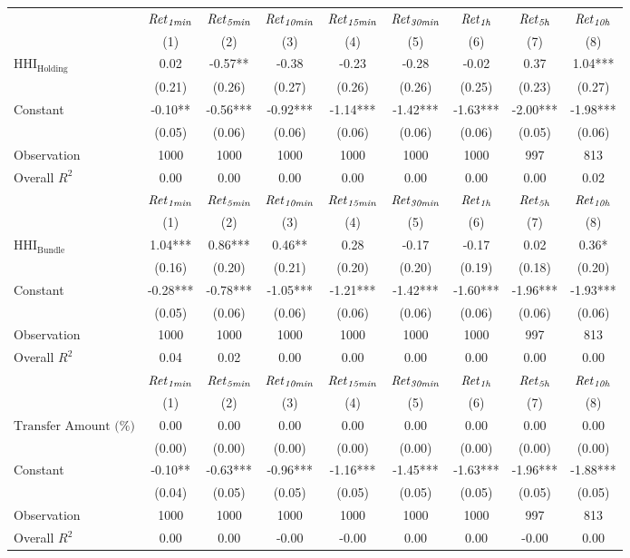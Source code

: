 \begin{tabular}{lcccccccc}
\hline
 & ${\it Ret}_{\it 1min}$ & ${\it Ret}_{\it 5min}$ & ${\it Ret}_{\it 10min}$ & ${\it Ret}_{\it 15min}$ & ${\it Ret}_{\it 30min}$ & ${\it Ret}_{\it 1h}$ & ${\it Ret}_{\it 5h}$ & ${\it Ret}_{\it 10h}$ \\
 & (1) & (2) & (3) & (4) & (5) & (6) & (7) & (8) \\
\hline
$\text{HHI}_{\text{Holding}}$ & 0.02 & -0.57** & -0.38 & -0.23 & -0.28 & -0.02 & 0.37 & 1.04*** \\
 & (0.21) & (0.26) & (0.27) & (0.26) & (0.26) & (0.25) & (0.23) & (0.27) \\
Constant & -0.10** & -0.56*** & -0.92*** & -1.14*** & -1.42*** & -1.63*** & -2.00*** & -1.98*** \\
 & (0.05) & (0.06) & (0.06) & (0.06) & (0.06) & (0.06) & (0.05) & (0.06) \\
Observation & 1000 & 1000 & 1000 & 1000 & 1000 & 1000 & 997 & 813 \\
Overall $R^2$ & 0.00 & 0.00 & 0.00 & 0.00 & 0.00 & 0.00 & 0.00 & 0.02 \\
\hline
 & ${\it Ret}_{\it 1min}$ & ${\it Ret}_{\it 5min}$ & ${\it Ret}_{\it 10min}$ & ${\it Ret}_{\it 15min}$ & ${\it Ret}_{\it 30min}$ & ${\it Ret}_{\it 1h}$ & ${\it Ret}_{\it 5h}$ & ${\it Ret}_{\it 10h}$ \\
 & (1) & (2) & (3) & (4) & (5) & (6) & (7) & (8) \\
\hline
$\text{HHI}_{\text{Bundle}}$ & 1.04*** & 0.86*** & 0.46** & 0.28 & -0.17 & -0.17 & 0.02 & 0.36* \\
 & (0.16) & (0.20) & (0.21) & (0.20) & (0.20) & (0.19) & (0.18) & (0.20) \\
Constant & -0.28*** & -0.78*** & -1.05*** & -1.21*** & -1.42*** & -1.60*** & -1.96*** & -1.93*** \\
 & (0.05) & (0.06) & (0.06) & (0.06) & (0.06) & (0.06) & (0.06) & (0.06) \\
Observation & 1000 & 1000 & 1000 & 1000 & 1000 & 1000 & 997 & 813 \\
Overall $R^2$ & 0.04 & 0.02 & 0.00 & 0.00 & 0.00 & 0.00 & 0.00 & 0.00 \\
\hline
 & ${\it Ret}_{\it 1min}$ & ${\it Ret}_{\it 5min}$ & ${\it Ret}_{\it 10min}$ & ${\it Ret}_{\it 15min}$ & ${\it Ret}_{\it 30min}$ & ${\it Ret}_{\it 1h}$ & ${\it Ret}_{\it 5h}$ & ${\it Ret}_{\it 10h}$ \\
 & (1) & (2) & (3) & (4) & (5) & (6) & (7) & (8) \\
\hline
$\text{Transfer Amount (\%)}$ & 0.00 & 0.00 & 0.00 & 0.00 & 0.00 & 0.00 & 0.00 & 0.00 \\
 & (0.00) & (0.00) & (0.00) & (0.00) & (0.00) & (0.00) & (0.00) & (0.00) \\
Constant & -0.10** & -0.63*** & -0.96*** & -1.16*** & -1.45*** & -1.63*** & -1.96*** & -1.88*** \\
 & (0.04) & (0.05) & (0.05) & (0.05) & (0.05) & (0.05) & (0.05) & (0.05) \\
Observation & 1000 & 1000 & 1000 & 1000 & 1000 & 1000 & 997 & 813 \\
Overall $R^2$ & 0.00 & 0.00 & -0.00 & -0.00 & 0.00 & 0.00 & -0.00 & 0.00 \\
\hline
\end{tabular}
